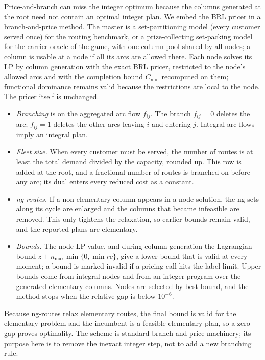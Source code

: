 \documentclass[preprint,12pt]{elsarticle}
\theoremstyle{definition}
\theoremstyle{remark}
\begin{document}
Price-and-branch can miss the integer optimum because the columns generated at the root need not contain an optimal integer plan. We embed the BRL pricer in a branch-and-price method. The master is a set-partitioning model (every customer served once) for the routing benchmark, or a prize-collecting set-packing model for the carrier oracle of the game, with one column pool shared by all nodes; a column is usable at a node if all its arcs are allowed there. Each node solves its LP by column generation with the exact BRL pricer, restricted to the node's allowed arcs and with the completion bound $C_{\min}$ recomputed on them; functional dominance remains valid because the restrictions are local to the node. The pricer itself is unchanged.
\begin{itemize}[leftmargin=*]
\item \emph{Branching} is on the aggregated arc flow $f_{ij}$. The branch $f_{ij}=0$ deletes the arc; $f_{ij}=1$ deletes the other arcs leaving $i$ and entering $j$. Integral arc flows imply an integral plan.
\item \emph{Fleet size.} When every customer must be served, the number of routes is at least the total demand divided by the capacity, rounded up. This row is added at the root, and a fractional number of routes is branched on before any arc; its dual enters every reduced cost as a constant.
\item \emph{ng-routes.} If a non-elementary column appears in a node solution, the ng-sets along its cycle are enlarged and the columns that became infeasible are removed. This only tightens the relaxation, so earlier bounds remain valid, and the reported plans are elementary.
\item \emph{Bounds.} The node LP value, and during column generation the Lagrangian bound $z+n_{\max}\min\{0,\min rc\}$, give a lower bound that is valid at every moment; a bound is marked invalid if a pricing call hits the label limit. Upper bounds come from integral nodes and from an integer program over the generated elementary columns. Nodes are selected by best bound, and the method stops when the relative gap is below $10^{-6}$.
\end{itemize}
Because ng-routes relax elementary routes, the final bound is valid for the elementary problem and the incumbent is a feasible elementary plan, so a zero gap proves optimality. The scheme is standard branch-and-price machinery; its purpose here is to remove the inexact integer step, not to add a new branching rule.
\end{document}
